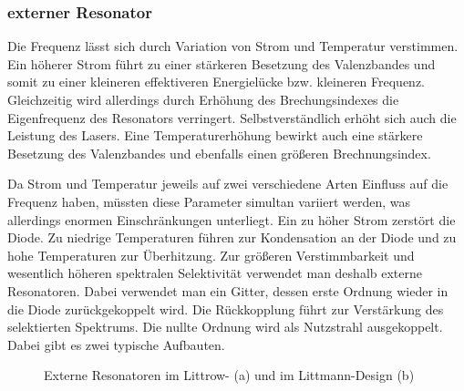 \subsubsection{externer Resonator}\label{subsubsec:externer_resonator}
Die Frequenz lässt sich durch Variation von Strom und Temperatur verstimmen. Ein
höherer Strom führt zu einer stärkeren Besetzung des Valenzbandes und somit zu
einer kleineren effektiveren Energielücke bzw. kleineren Frequenz. Gleichzeitig
wird allerdings durch Erhöhung des Brechungsindexes die Eigenfrequenz des
Resonators verringert. Selbstverständlich erhöht sich auch die Leistung des
Lasers. Eine Temperaturerhöhung bewirkt auch eine stärkere Besetzung des
Valenzbandes und ebenfalls einen größeren Brechnungsindex.\par
Da Strom und Temperatur jeweils auf zwei verschiedene Arten Einfluss auf die
Frequenz haben, müssten diese Parameter simultan variiert werden, was
allerdings enormen Einschränkungen unterliegt. Ein zu höher Strom zerstört die
Diode. Zu niedrige Temperaturen führen zur Kondensation an der Diode und zu hohe
Temperaturen zur Überhitzung. Zur größeren Verstimmbarkeit und wesentlich
höheren spektralen Selektivität verwendet man deshalb externe Resonatoren. Dabei
verwendet man ein Gitter, dessen erste Ordnung wieder in die Diode
zurückgekoppelt wird. Die Rückkopplung führt zur Verstärkung des selektierten Spektrums. Die
nullte Ordnung wird als Nutzstrahl ausgekoppelt. Dabei gibt es zwei typische
Aufbauten.\par
\begin{figure}[h]
 	\centering
	\caption[externe Resonatoren - Aufbau]{Externe Resonatoren im Littrow- (a) und
	im Littmann-Design (b)}\label{fig:externe_resonatoren_aufbau}
\end{figure}
